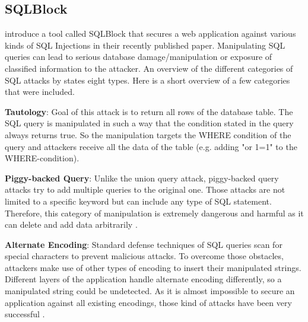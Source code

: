 \subsection{SQLBlock}

\textcite[]{Jahanshahi2018} introduce a tool called SQLBlock that secures a web application against various kinds of SQL Injections in their recently published paper. Manipulating SQL queries can lead to serious database damage/manipulation or exposure of classified information to the attacker. An overview of the different categories of SQL attacks by \textcite[3ff.]{Halfond2008} states eight types. Here is a short overview of a few categories that were included.\newline


\textbf{Tautology}: Goal of this attack is to return all rows of the database table. The SQL query is manipulated in such a way that the condition stated in the query always returns true. So the manipulation targets the WHERE condition of the query and attackers receive all the data of the table (e.g. adding "or 1=1" to the WHERE-condition)\autocite[3]{Halfond2008}.\newline


\textbf{Piggy-backed Query}: Unlike the union query attack, piggy-backed query attacks try to add multiple queries to the original one. Those attacks are not limited to a specific keyword but can include any type of SQL statement. Therefore, this category of manipulation is extremely dangerous and harmful as it can delete and add data arbitrarily \autocite[4]{Halfond2008}.\newline


\textbf{Alternate Encoding}: Standard defense techniques of SQL queries scan for special characters to prevent malicious attacks. To overcome those obstacles, attackers make use of other types of encoding to insert their manipulated strings. Different layers of the application handle alternate encoding differently, so a manipulated string could be undetected. As it is almost impossible to secure an application against all existing encodings, those kind of attacks have been very successful \autocite[5]{Halfond2008}.\newline

